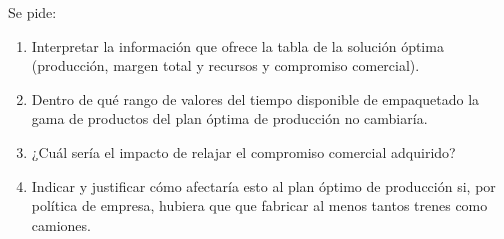 Se pide:

\begin{enumerate}
    \item Interpretar la información que ofrece la tabla de la solución óptima (producción, margen total y recursos y compromiso comercial).

    \item Dentro de qué rango de valores del tiempo disponible de empaquetado la gama de productos del plan óptima de producción no cambiaría.

    \item ¿Cuál sería el impacto de relajar el compromiso comercial adquirido?

    \item Indicar y justificar cómo afectaría esto al plan óptimo de producción si, por política de empresa, hubiera que que fabricar al menos tantos trenes como camiones.
    
\end{enumerate}
